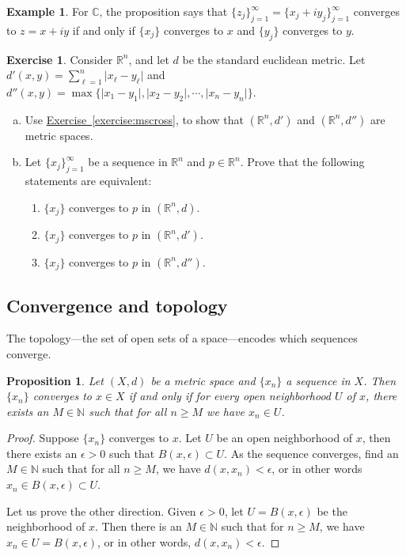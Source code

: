 \documentclass[12pt,openany]{book}
\newcommand{\sabs}[1]{\lvert {#1} \rvert}
\newcommand{\C}{{\mathbb{C}}}
\newcommand{\R}{{\mathbb{R}}}
\newcommand{\N}{{\mathbb{N}}}
\theoremstyle{plain}
\newtheorem{prop}[thm]{Proposition}
\theoremstyle{remark}
\theoremstyle{definition}
\newenvironment{exbox}{%
    \def\FrameCommand{\vrule width 1pt \relax\hspace{10pt}}%
    \MakeFramed{\advance\hsize-\width\FrameRestore}%
}{%
    \endMakeFramed
}
\newenvironment{exparts}{%
    \leavevmode\begin{enumerate}[a),noitemsep,topsep=0pt,parsep=0pt,partopsep=0pt]
}{%
    \end{enumerate}
}
\newenvironment{exnumparts}{%
    \leavevmode\begin{enumerate}[1),noitemsep,topsep=0pt,parsep=0pt,partopsep=0pt]
}{%
    \end{enumerate}
}
\theoremstyle{exercise}
\newtheorem{exercise}{Exercise}[section]
\theoremstyle{example}
\newtheorem{example}[thm]{Example}
\newcommand{\exerciseref}[1]{\hyperref[#1]{Exercise~\ref*{#1}}}
\begin{document}
\begin{example}
For $\C$, the proposition says that
$\{ z_j \}_{j=1}^\infty = \{ x_j + iy_j \}_{j=1}^\infty$ converges
to $z = x+iy$
if and only if $\{ x_j \}$ converges to $x$ and 
$\{ y_j \}$ converges to $y$.
\end{example}

\begin{exbox}
\begin{exercise}
Consider $\R^n$, and let $d$ be the standard euclidean metric.
Let $d'(x,y) = \sum_{\ell=1}^n \sabs{x_\ell-y_\ell}$
and $d''(x,y) = \max \bigl\{ \sabs{x_1-y_1},\sabs{x_2-y_2},\cdots,\sabs{x_n-y_n}
\bigr\}$.
\begin{exparts}
\item
Use \exerciseref{exercise:mscross}, to show that
$(\R^n,d')$ and
$(\R^n,d'')$ are metric spaces.
\item
Let $\{ x_j \}_{j=1}^\infty$ be a sequence in $\R^n$ and $p \in \R^n$.
Prove that the following statements are equivalent:
\begin{exnumparts}
\item
$\{ x_j \}$ converges to $p$ in $(\R^n,d)$.
\item
$\{ x_j \}$ converges to $p$ in $(\R^n,d')$.
\item
$\{ x_j \}$ converges to $p$ in $(\R^n,d'')$.
\end{exnumparts}
\end{exparts}
\end{exercise}
\end{exbox}

\subsection{Convergence and topology}

The topology---the set of open sets of a space---encodes which
sequences converge.

\begin{prop} \label{prop:msconvtopo}
Let $(X,d)$ be a metric space and $\{x_n\}$ a sequence in $X$.  Then
$\{ x_n \}$ converges to $x \in X$ if and only if for every open neighborhood
$U$ of $x$, there exists an $M \in \N$ such that for all $n \geq M$
we have $x_n \in U$.
\end{prop}

\begin{proof}
Suppose $\{ x_n \}$ converges to $x$.  Let $U$ be an open neighborhood
of $x$, then there exists an $\epsilon > 0$ such that $B(x,\epsilon) \subset
U$.  As the sequence converges, find an $M \in \N$ such that for all $n \geq
M$, we have $d(x,x_n) < \epsilon$, or in other words $x_n \in B(x,\epsilon)
\subset U$.

Let us prove the other direction.  Given $\epsilon > 0$, let $U =
B(x,\epsilon)$ be the neighborhood of $x$.  Then there is an $M \in \N$
such that for $n \geq M$, we have $x_n \in U = B(x,\epsilon)$, or in other
words, $d(x,x_n) < \epsilon$.
\end{proof}
\end{document}
